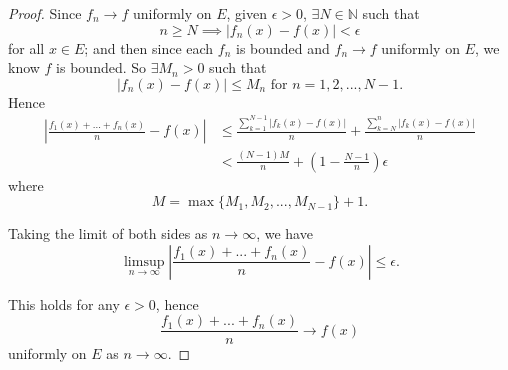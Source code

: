 \begin{Exercise}
\begin{proof}
Since $f_n\to f$ uniformly on $E$, given $\epsilon > 0$, $\exists N\in\mathbb{N}$ such that $$n\geq N \implies \left| f_n(x)-f(x) \right| < \epsilon$$ for all $x\in E$; and then since each $f_n$ is bounded and $f_n\to f$ uniformly on $E$, we know $f$ is bounded. So $\exists M_n > 0$ such that 
$$
\left| f_n(x)-f(x) \right| 
\leq M_n\mbox{ for } n=1,2,...,N-1.
$$
Hence 
\begin{align*}
\left| \frac{f_1(x)+...+f_n(x)}{n}-f(x) \right| 
&\leq \frac{\sum_{k=1}^{N-1}\left| f_k(x)-f(x) \right|}{n} + \frac{\sum_{k=N}^{n}\left| f_k(x)-f(x) \right|}{n} \\
&< \frac{(N-1)M}{n} + \left( 1-\frac{N-1}{n} \right) \epsilon
\end{align*}
where 
$$ 
M = \max\{M_1,M_2,...,M_{N-1}\}+1.
$$

Taking the limit of both sides as $n\to\infty$, we have
$$ 
\limsup_{n\to\infty}\left| \frac{f_1(x)+...+f_n(x)}{n}-f(x) \right| 
\leq \epsilon.
$$

This holds for any $\epsilon > 0$, hence
$$
\frac{f_1(x)+...+f_n(x)}{n}\to f(x)
$$ 
uniformly on $E$ as $n\to\infty$.
\end{proof}
\end{Exercise}